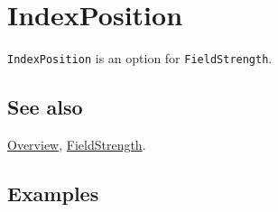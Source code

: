 \documentclass[../FeynCalcManual.tex]{subfiles}
\begin{document}
\hypertarget{indexposition}{%
\section{IndexPosition}\label{indexposition}}

\texttt{IndexPosition} is an option for \texttt{FieldStrength}.

\subsection{See also}

\hyperlink{toc}{Overview}, \hyperlink{fieldstrength}{FieldStrength}.

\subsection{Examples}
\end{document}
